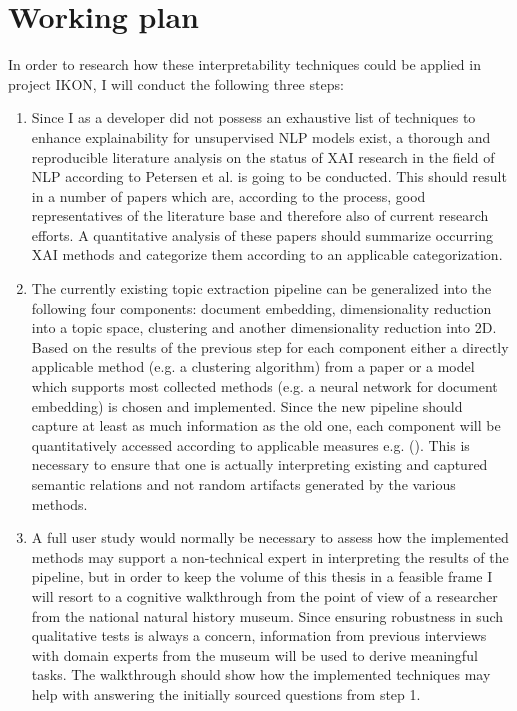 \section{Working plan}
In order to research how these interpretability techniques could be applied in project IKON, I will conduct the following three steps:

\begin{enumerate}
	\item Since I as a developer did not possess an exhaustive list of techniques to enhance explainability for unsupervised NLP models exist, a thorough and reproducible literature analysis on the status of XAI research in the field of NLP according to Petersen et al. \cite{petersenSystematicMappingStudies2008a} is going to be conducted. This should result in a number of papers which are, according to the process, good representatives of the literature base and therefore also of current research efforts. A quantitative analysis of these papers should summarize occurring XAI methods and categorize them according to an applicable categorization. 
	
	\item The currently existing topic extraction pipeline can be generalized into the following four components: document embedding, dimensionality reduction into a topic space, clustering and another dimensionality reduction into 2D. Based on the results of the previous step for each component either a directly applicable method (e.g. a clustering algorithm) from a paper or a model which supports most collected methods (e.g. a neural network for document embedding) is chosen and implemented. Since the new pipeline should capture at least as much information as the old one, each component will be quantitatively accessed according to applicable measures e.g. (\cite{roderExploringSpaceTopic2015a}). This is necessary to ensure that one is actually interpreting existing and captured semantic relations and not random artifacts generated by the various methods.
	
	\item A full user study would normally be necessary to assess how the implemented methods may support a non-technical expert in interpreting the results of the pipeline, but in order to keep the volume of this thesis in a feasible frame I will resort to a cognitive walkthrough from the point of view of a researcher from the national natural history museum.
	Since ensuring robustness in such qualitative tests is always a concern, information from previous interviews with domain experts from the museum will be used to derive meaningful tasks. The walkthrough should show how the implemented techniques may help with answering the initially sourced questions from step 1.
\end{enumerate}

